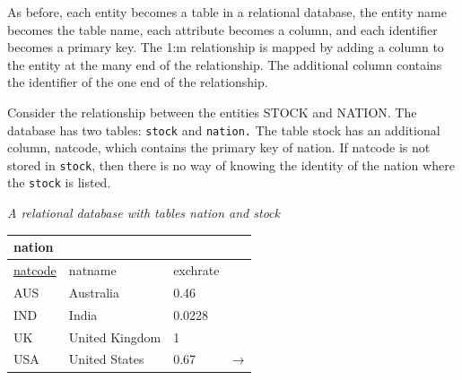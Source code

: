 \documentclass[
]{article}
\begin{document}
As before, each entity becomes a table in a relational database, the
entity name becomes the table name, each attribute becomes a column, and
each identifier becomes a primary key. The 1:m relationship is mapped by
adding a column to the entity at the many end of the relationship. The
additional column contains the identifier of the one end of the
relationship.

Consider the relationship between the entities STOCK and NATION. The
database has two tables: \texttt{stock} and \texttt{nation.} The table stock has an
additional column, natcode, which contains the primary key of nation. If
natcode is not stored in \texttt{stock}, then there is no way of knowing the
identity of the nation where the \texttt{stock} is listed.

\emph{A relational database with tables nation and stock}

\begin{longtable}[]{@{}llll@{}}
\toprule
nation & & & \\
\midrule
\endhead
\underline{natcode} & natname & exchrate & \\
AUS & Australia & 0.46 & \\
IND & India & 0.0228 & \\
UK & United Kingdom & 1 & \\
USA & United States & 0.67 & → \\
\bottomrule
\end{longtable}
\end{document}
